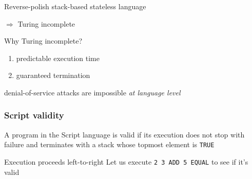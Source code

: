\documentclass[11pt]{beamer}  %
\begin{document}
\begin{frame}
\begin{greenbox}{Reverse-polish stack-based stateless language}
    \begin{center}
      \alert{$\Rightarrow$ Turing incomplete}
    \end{center}

  \end{greenbox}

  \bigskip

  \begin{greenbox}{Why Turing incomplete?}
    \begin{enumerate}
    \item predictable execution time
    \item guaranteed termination
    \end{enumerate}

    \begin{center}
      denial-of-service attacks are impossible \emph{at language level}
    \end{center}

  \end{greenbox}

\end{frame}

\begin{frame}\frametitle{Script validity}

  \begin{greenbox}{}
    A program in the Script language is \alert{valid} if its execution
    does not stop with failure and terminates with a stack whose topmost element is \texttt{TRUE}
  \end{greenbox}

  \bigskip

  \begin{greenbox}{Execution proceeds left-to-right}
    Let us execute \texttt{2 3 ADD 5 EQUAL} to see if it's valid
  \end{greenbox}

\end{frame}
\end{document}
